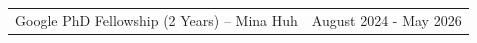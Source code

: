 \begin{longtable}{Xr}
	Google PhD Fellowship (2 Years) -- Mina Huh & August 2024 - May 2026 \\
\end{longtable}
